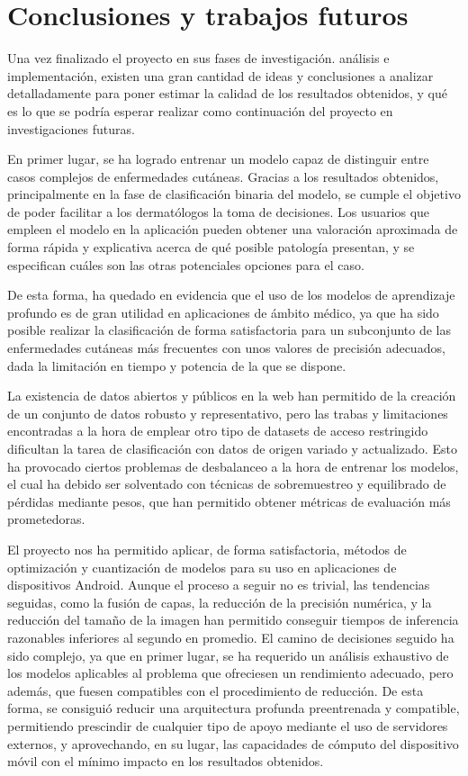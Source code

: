 \chapter{Conclusiones y trabajos futuros}

Una vez finalizado el proyecto en sus fases de investigación. análisis e implementación, existen una gran cantidad de ideas y conclusiones a analizar detalladamente para poner estimar la calidad de los resultados obtenidos, y qué es lo que se podría esperar realizar como continuación del proyecto en investigaciones futuras.

En primer lugar, se ha logrado entrenar un modelo capaz de distinguir entre casos complejos de enfermedades cutáneas. Gracias a los resultados obtenidos, principalmente en la fase de clasificación binaria del modelo, se cumple el objetivo de poder facilitar a los dermatólogos la toma de decisiones.  Los usuarios que empleen el modelo en la aplicación pueden obtener una valoración aproximada de forma rápida y explicativa acerca de qué posible patología presentan, y se especifican cuáles son las otras potenciales opciones para el caso.

De esta forma, ha quedado en evidencia que el uso de los modelos de aprendizaje profundo es de gran utilidad en aplicaciones de ámbito médico, ya que ha sido posible realizar la clasificación de forma satisfactoria para un subconjunto de las enfermedades cutáneas más frecuentes con unos valores de precisión adecuados, dada la limitación en tiempo y potencia de la que se dispone. 

La existencia de datos abiertos  y públicos en la web han permitido de la creación de un conjunto de datos robusto y representativo, pero las trabas y limitaciones encontradas a la hora de emplear otro tipo de datasets de acceso restringido dificultan la tarea de clasificación con datos de origen variado y actualizado. Esto ha provocado ciertos problemas de desbalanceo a la hora de entrenar los modelos, el cual ha debido ser solventado con técnicas de sobremuestreo y equilibrado de pérdidas mediante pesos, que han permitido obtener métricas de evaluación más prometedoras.

El proyecto nos ha permitido aplicar, de forma satisfactoria, métodos de optimización y cuantización de modelos para su uso en aplicaciones de dispositivos Android. Aunque el proceso a seguir no es trivial, las tendencias seguidas, como la fusión de capas, la reducción de la precisión numérica, y la reducción del tamaño de la imagen han permitido conseguir tiempos de inferencia razonables inferiores al segundo en promedio. El camino de decisiones seguido ha sido complejo, ya que en primer lugar, se ha requerido un análisis exhaustivo de los modelos aplicables al problema que ofreciesen un rendimiento adecuado, pero además, que fuesen compatibles con el procedimiento de reducción. De esta forma, se consiguió reducir una arquitectura profunda preentrenada y compatible, permitiendo prescindir de cualquier tipo de apoyo mediante el uso de servidores externos, y aprovechando, en su lugar, las capacidades de cómputo del dispositivo móvil con el mínimo impacto en los resultados obtenidos.

